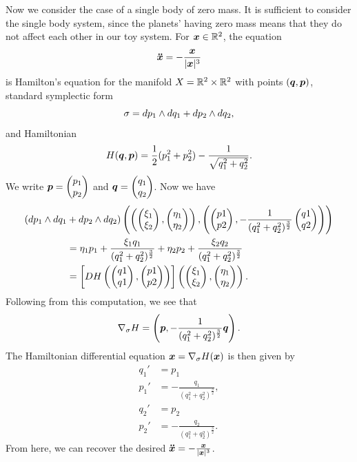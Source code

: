 \documentclass[twoside,letterpaper,10pt]{article}
\newcommand{\sgrad}{\nabla_{\sigma}}
\numberwithin{equation}{section}
\begin{document}
Now we consider the case of a single body of zero mass.
It is sufficient to consider the single body system, since the planets' having
zero mass means that they do not affect each other in our toy system.
For $\bm{x} \in \mathbb{R}^2$, the equation
\begin{equation*}
  \bm{\ddot{x}} = - \frac{\bm{x}}{|\bm{x}|^3}
\end{equation*}
is Hamilton's equation for the manifold $X = \mathbb{R}^2 \times \mathbb{R}^2$ with points
$(\bm{q}, \bm{p})$, standard symplectic form
\begin{equation*}
  \sigma = \mathop{}\!d p_1 \wedge \mathop{}\!d q_1 + \mathop{}\!d p_2 \wedge \mathop{}\!d q_2,
\end{equation*}
and Hamiltonian
\begin{equation*}
  H(\bm{q}, \bm{p}) = \frac{1}{2} (p_1^2 + p_2^2) - \frac{1}{\sqrt{q_1^2 +
      q_2^2}}.
\end{equation*}
We write $\bp{p} = \pt{p_1\\ p_2}$ and $\bp{q} = \pt{q_1\\q_2}$.
Now we have
\begin{align*}
  (\dif p_1 \wedge \dif q_1 &+ \dif p_2 \wedge \dif q_2)
                              \left(\left(\pt{\xi_1\\\xi_2}, \pt{\eta_1\\\eta_2}
  \right), \left( \pt{p1\\p2}, - \frac{1}{(q_1^2 + q_2^2)^{\frac{3}{2}}}
  \pt{q1\\q2} \right)\right)\\
                            &= \eta_1 p_1 + \frac{\xi_1 q_1}{(q_1^2 +
                              q_2^2)^{\frac{3}{2}}} + \eta_2 p_2 + \frac{\xi_2
                              q_2}{(q_1^2 + q_2^2)^{\frac{3}{2}}}\\
                            &= \left[ \Dif H \left( \pt{q1\\q1}, \pt{p1\\p2}
  \right) \right] \left( \pt{\xi_1\\\xi_2}, \pt{\eta_1\\\eta_2} \right).
\end{align*}
Following from this computation, we see that
\begin{equation*}
  \sgrad H = \left(\bp{p}, - \frac{1}{(q_1^2 + q_2^2)^{\frac{3}{2}}}\bp{q}
  \right).
\end{equation*}
The Hamiltonian differential equation $\bp{x} = \sgrad H(\bp{x})$ is then given
by
\begin{align*}
  q_1' &= p_1\\
  p_1' &= - \frac{q_1}{(q_1^2 + q_2^2)^{\frac{3}{2}}},\\
  q_2' &= p_2\\
  p_2' &= -\frac{q_2}{(q_1^2 + q_2^2)^{\frac{3}{2}}}.
\end{align*}
From here, we can recover the desired $\bm{\ddot{x}} = - \frac{\bm{x}}{|\bm{x}|^3}$.
\end{document}
